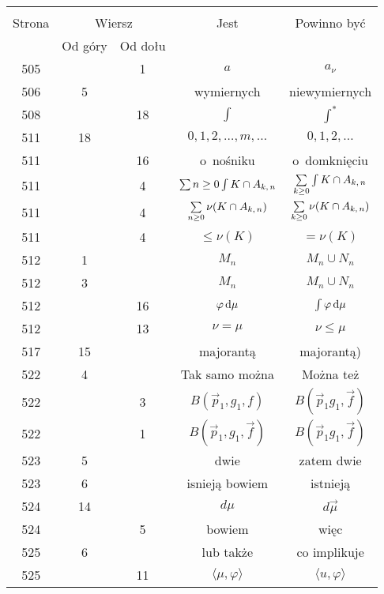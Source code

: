 \documentclass[a4paper,11pt]{article}
\newcommand{\IntL}{\int\limits}
\newcommand{\vp}{\varphi}
\newcommand{\ld}{\ldots}
\begin{document}
\begin{center}
  \begin{tabular}{|c|c|c|c|c|}
    \hline
    & \multicolumn{2}{c|}{} & & \\
    Strona & \multicolumn{2}{c|}{Wiersz}& Jest & Powinno być \\ \cline{2-3}
    & Od góry & Od dołu &  &  \\ \hline
    505 & &  1 & $a$ & $a_{ \nu }$ \\
    506 &  5 & & wymiernych & niewymiernych \\
    508 & & 18 & $\int$ & $\int^{ * }$ \\
    511 & 18 & & $0, 1, 2, \ld, m, \ld$ & $0, 1, 2, \ld$ \\
    511 & & 16 & o~nośniku & o~domknięciu \\
    511 & &  4 & $\Sum{ n \geq 0 } \IntL{ K \cap A_{ k,\, n } }$
           & $\Sum_{ k \geq 0 } \IntL{ K \cap A_{ k,\, n } }$ \\
    511 & &  4 & $\sum\limits_{ n \geq 0 } \nu( K \cap A_{ k,\, n } )$
           & $\sum\limits_{ k \geq 0 } \nu( K \cap A_{ k,\, n } )$ \\
    511 & &  4 & $\leq \nu( K )$ & $= \nu( K )$ \\
    512 &  1 & & $M_{ n }$ & $M_{ n } \cup N_{ n }$ \\
    512 &  3 & & $M_{ n }$ & $M_{ n } \cup N_{ n }$ \\
    512 & & 16 & $\vp\, \de \mu$ & $\int \vp\, \de \mu$ \\
    512 & & 13 & $\nu = \mu$ & $\nu \leq \mu$ \\
    517 & 15 & & majorantą & majorantą) \\
    522 &  4 & & Tak samo można & Można też \\
    522 & &  3 & $B( \vec{ p }_{ 1 }, g_{ 1 }, f )$
           & $B( \vec{ p }_{ 1 } g_{ 1 }, \vec{ f } )$ \\
    522 & &  1 & $B( \vec{ p }_{ 1 }, g_{ 1 }, \vec{ f } )$
           & $B( \vec{ p }_{ 1 } g_{ 1 }, \vec{ f } )$ \\
    523 &  5 & & dwie & zatem dwie \\
    523 &  6 & & isnieją bowiem & istnieją \\
    524 & 14 & & $d \mu$ & $d \vec{ \mu }$ \\
    524 & &  5 & bowiem & więc \\
    525 &  6 & & lub także & co implikuje \\
    525 & & 11 & $\langle \mu, \varphi \rangle$
           & $\langle u, \varphi \rangle$ \\

\end{tabular}
\end{center}
\end{document}
